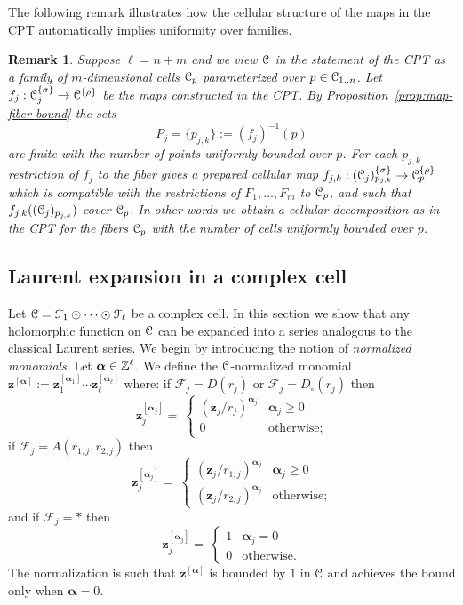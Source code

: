 \documentclass[reqno]{amsart}
\newtheorem{Rem}[Cor]{Remark}{\scshape}{\rmfamily}
\renewcommand\ge{\geqslant} \renewcommand\le{\leqslant}
\renewcommand\~[1]{\widetilde{#1}}
\def\cF{{\mathcal F}} \def\cL{{\mathcal L}} \def\cR{{\mathcal R}}
\def\vz{{\mathbf z}}
\def\valpha{{\boldsymbol\alpha}}
\def\he#1{{\{#1\}}}
\def\hrho{{\he\rho}}
\def\hsigma{{\he\sigma}}
\begin{document}
The following remark illustrates how the cellular structure of the
maps in the CPT automatically implies uniformity over families.

\begin{Rem}\label{rem:uniform-cpt}
  Suppose $\ell=n+m$ and we view ${\mathcal C}$ in the statement of the CPT as
  a family of $m$-dimensional cells ${\mathcal C}_p$ parameterized over
  $p\in{\mathcal C}_{1..n}$. Let $f_j:\cC_j^\hsigma\to\cC^\hrho$ be the maps
  constructed in the CPT. By Proposition~\ref{prop:map-fiber-bound}
  the sets
  \begin{equation}
    P_j = \{p_{j,k}\} := (f_j)^{-1}(p)
  \end{equation}
  are finite with the number of points uniformly bounded over $p$. For
  each $p_{j,k}$ restriction of $f_j$ to the fiber gives a prepared
  cellular map $f_{j,k}:(\cC_j)^\hsigma_{p_{j,k}}\to\cC^\hrho_p$ which
  is compatible with the restrictions of $F_1,\ldots,F_m$ to ${\mathcal C}_p$,
  and such that $f_{j,k}(({\mathcal C}_j)_{p_{j,k}})$ cover ${\mathcal C}_p$. In other words
  we obtain a cellular decomposition as in the CPT for the fibers
  ${\mathcal C}_p$ with the number of cells uniformly bounded over $p$.
\end{Rem}


\subsection{Laurent expansion in a complex cell}

Let $\cC=\cF_1\odot\dots\odot\cF_\ell$ be a complex cell. In this
section we show that any holomorphic function on ${\mathcal C}$ can be expanded
into a series analogous to the classical Laurent series. We begin by
introducing the notion of \emph{normalized monomials}. Let
$\valpha\in\Z^\ell$. We define the ${\mathcal C}$-normalized monomial
$\vz^{[\valpha]}:=\vz_1^{[\valpha_1]}\cdots\vz_\ell^{[\valpha_\ell]}$
where: if $\cF_j=D(r_j)$ or $\cF_j=D_\circ(r_j)$ then
\begin{equation}
  \vz_j^{[\valpha_j]} = \
  \begin{cases}
    (\vz_j/r_j)^{\valpha_j} & \valpha_j\ge 0 \\
    0 & \text{otherwise};
  \end{cases}
\end{equation}
if $\cF_j=A(r_{1,j},r_{2,j})$ then
\begin{equation}
  \vz_j^{[\valpha_j]} = \
  \begin{cases}
    (\vz_j/r_{1,j})^{\valpha_j} & \valpha_j\ge 0 \\
    (\vz_j/r_{2,j})^{\valpha_j} & \text{otherwise};
  \end{cases}
\end{equation}
and if $\cF_j=*$ then
\begin{equation}
  \vz_j^{[\valpha_j]} = \
  \begin{cases}
    1 & \valpha_j=0 \\
    0 & \text{otherwise}.
  \end{cases}
\end{equation}
The normalization is such that $\vz^{[\valpha]}$ is bounded by $1$ in
${\mathcal C}$ and achieves the bound only when $\valpha=0$.
\end{document}

